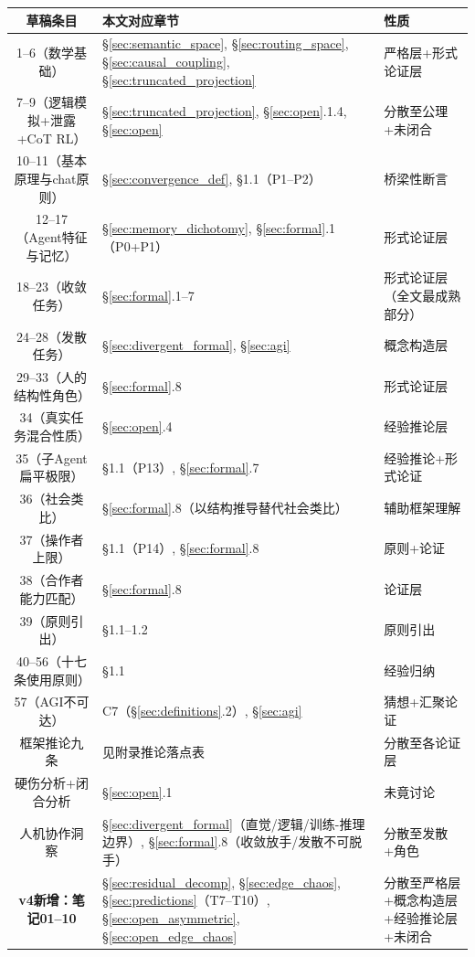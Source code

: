 \documentclass[11pt,a4paper]{article}
\theoremstyle{definition}
\begin{document}
\begin{table}[H]
\centering
\begin{tabular}{@{}c@{}p{4.5cm}p{5cm}@{}}
\toprule
\textbf{草稿条目} & \textbf{本文对应章节} & \textbf{性质} \\
\midrule
1--6（数学基础） & \S\ref{sec:semantic_space}, \S\ref{sec:routing_space}, \S\ref{sec:causal_coupling}, \S\ref{sec:truncated_projection} & 严格层+形式论证层 \\
7--9（逻辑模拟+泄露+CoT RL） & \S\ref{sec:truncated_projection}, \S\ref{sec:open}.1.4, \S\ref{sec:open} & 分散至公理+未闭合 \\
10--11（基本原理与chat原则） & \S\ref{sec:convergence_def}, \S1.1（P1--P2） & 桥梁性断言 \\
12--17（Agent特征与记忆） & \S\ref{sec:memory_dichotomy}, \S\ref{sec:formal}.1（P0+P1） & 形式论证层 \\
18--23（收敛任务） & \S\ref{sec:formal}.1--7 & 形式论证层（全文最成熟部分） \\
24--28（发散任务） & \S\ref{sec:divergent_formal}, \S\ref{sec:agi} & 概念构造层 \\
29--33（人的结构性角色） & \S\ref{sec:formal}.8 & 形式论证层 \\
34（真实任务混合性质） & \S\ref{sec:open}.4 & 经验推论层 \\
35（子Agent扁平极限） & \S1.1（P13）, \S\ref{sec:formal}.7 & 经验推论+形式论证 \\
36（社会类比） & \S\ref{sec:formal}.8（以结构推导替代社会类比） & 辅助框架理解 \\
37（操作者上限） & \S1.1（P14）, \S\ref{sec:formal}.8 & 原则+论证 \\
38（合作者能力匹配） & \S\ref{sec:formal}.8 & 论证层 \\
39（原则引出） & \S1.1--1.2 & 原则引出 \\
40--56（十七条使用原则） & \S1.1 & 经验归纳 \\
57（AGI不可达） & C7（\S\ref{sec:definitions}.2）, \S\ref{sec:agi} & 猜想+汇聚论证 \\
框架推论九条 & 见附录推论落点表 & 分散至各论证层 \\
硬伤分析+闭合分析 & \S\ref{sec:open}.1 & 未竟讨论 \\
人机协作洞察 & \S\ref{sec:divergent_formal}（直觉/逻辑/训练-推理边界）, \S\ref{sec:formal}.8（收敛放手/发散不可脱手） & 分散至发散+角色 \\
\bfseries v4新增：笔记01--10 & \S\ref{sec:residual_decomp}, \S\ref{sec:edge_chaos}, \S\ref{sec:predictions}（T7--T10）, \S\ref{sec:open_asymmetric}, \S\ref{sec:open_edge_chaos} & 分散至严格层+概念构造层+经验推论层+未闭合 \\
\bottomrule
\end{tabular}
\end{table}

\newpage
\printbibliography
\end{document}
